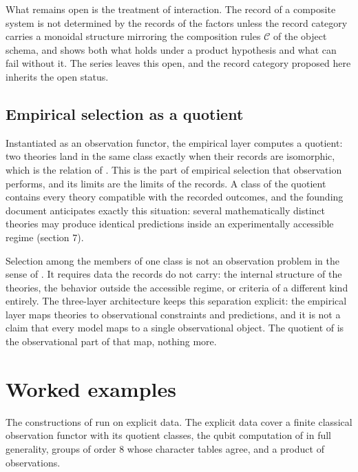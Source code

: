 \documentclass[11pt,letterpaper]{article}
\theoremstyle{definition}
\theoremstyle{remark}
\begin{document}
What remains open is the treatment of interaction. The record of a composite system is not determined by the records of the factors unless the record category carries a monoidal structure mirroring the composition rules $\mathcal{C}$ of the object schema, and  shows both what holds under a product hypothesis and what can fail without it. The series leaves this open, and the record category proposed here inherits the open status.

\subsection{Empirical selection as a quotient}

Instantiated as an observation functor, the empirical layer computes a quotient: two theories land in the same class exactly when their records are isomorphic, which is the relation of . This is the part of empirical selection that observation performs, and its limits are the limits of the records. A class of the quotient contains every theory compatible with the recorded outcomes, and the founding document anticipates exactly this situation: several mathematically distinct theories may produce identical predictions inside an experimentally accessible regime (section 7).

Selection among the members of one class is not an observation problem in the sense of . It requires data the records do not carry: the internal structure of the theories, the behavior outside the accessible regime, or criteria of a different kind entirely. The three-layer architecture keeps this separation explicit: the empirical layer maps theories to observational constraints and predictions, and it is not a claim that every model maps to a single observational object. The quotient of  is the observational part of that map, nothing more.

\section{Worked examples}
\label{sec:examples}

The constructions of  run on explicit data. The explicit data cover a finite classical observation functor with its quotient classes, the qubit computation of  in full generality, groups of order 8 whose character tables agree, and a product of observations.
\end{document}
